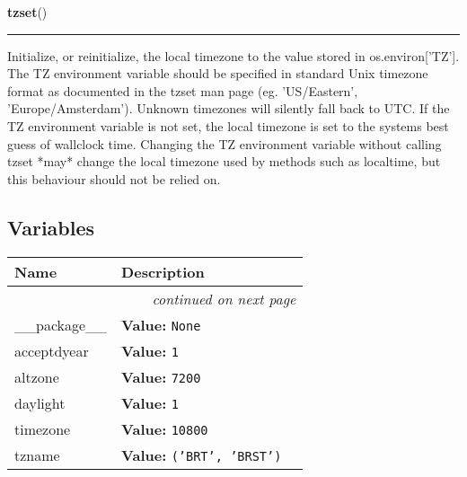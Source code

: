 \hspace{.8\funcindent}\begin{boxedminipage}{\funcwidth}

    \raggedright \textbf{tzset}()

    \vspace{-1.5ex}

    \rule{\textwidth}{0.5\fboxrule}
\setlength{\parskip}{2ex}
    Initialize, or reinitialize, the local timezone to the value stored in 
    os.environ['TZ']. The TZ environment variable should be specified in 
    standard Unix timezone format as documented in the tzset man page (eg. 
    'US/Eastern', 'Europe/Amsterdam'). Unknown timezones will silently fall
    back to UTC. If the TZ environment variable is not set, the local 
    timezone is set to the systems best guess of wallclock time. Changing 
    the TZ environment variable without calling tzset *may* change the 
    local timezone used by methods such as localtime, but this behaviour 
    should not be relied on.

\setlength{\parskip}{1ex}
    \end{boxedminipage}



  \subsection{Variables}

    \vspace{-1cm}
\hspace{\varindent}\begin{longtable}{|p{\varnamewidth}|p{\vardescrwidth}|l}
\cline{1-2}
\cline{1-2} \centering \textbf{Name} & \centering \textbf{Description}& \\
\cline{1-2}
\endhead\cline{1-2}\multicolumn{3}{r}{\small\textit{continued on next page}}\\\endfoot\cline{1-2}
\endlastfoot\raggedright \_\-\_\-p\-a\-c\-k\-a\-g\-e\-\_\-\_\- & \raggedright \textbf{Value:} 
{\tt None}&\\
\cline{1-2}
\raggedright a\-c\-c\-e\-p\-t\-2\-d\-y\-e\-a\-r\- & \raggedright \textbf{Value:} 
{\tt 1}&\\
\cline{1-2}
\raggedright a\-l\-t\-z\-o\-n\-e\- & \raggedright \textbf{Value:} 
{\tt 7200}&\\
\cline{1-2}
\raggedright d\-a\-y\-l\-i\-g\-h\-t\- & \raggedright \textbf{Value:} 
{\tt 1}&\\
\cline{1-2}
\raggedright t\-i\-m\-e\-z\-o\-n\-e\- & \raggedright \textbf{Value:} 
{\tt 10800}&\\
\cline{1-2}
\raggedright t\-z\-n\-a\-m\-e\- & \raggedright \textbf{Value:} 
{\tt \texttt{(}\texttt{'}\texttt{BRT}\texttt{'}\texttt{, }\texttt{'}\texttt{BRST}\texttt{'}\texttt{)}}&\\
\cline{1-2}
\end{longtable}


